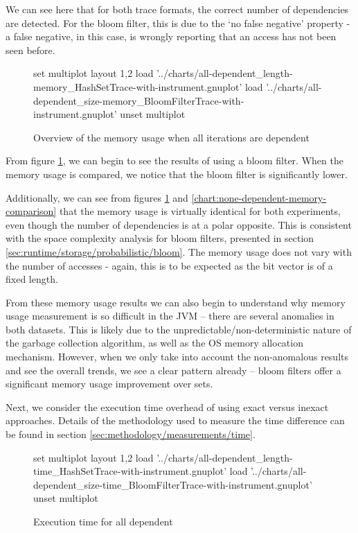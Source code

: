 	We can see here that for both trace formats, the correct number of dependencies are detected. For the bloom filter, this is due to the `no false negative' property - a false negative, in this case, is wrongly reporting that an access has not been seen before.
	
	\begin{figure}
		\centering
		\begin{gnuplot}[terminal=pdf]
		set multiplot layout 1,2
			load '../charts/all-dependent_length-memory_HashSetTrace-with-instrument.gnuplot'
			load '../charts/all-dependent_size-memory_BloomFilterTrace-with-instrument.gnuplot'
					unset multiplot
		\end{gnuplot}
		\caption{Overview of the memory usage when all iterations are dependent}
		\label{chart:all-dependent-memory-comparison}
	\end{figure}
	
	From figure \ref{chart:all-dependent-memory-comparison}, we can begin to see the results of using a bloom filter. When the memory usage is compared, we notice that the bloom filter is significantly lower.
	
	Additionally, we can see from figures \ref{chart:all-dependent-memory-comparison} and \ref{chart:none-dependent-memory-comparison} that the memory usage is virtually identical for both experiments, even though the number of dependencies is at a polar opposite. This is consistent with the space complexity analysis for bloom filters, presented in section \ref{sec:runtime/storage/probabilistic/bloom}. The memory usage does not vary with the number of accesses - again, this is to be expected as the bit vector is of a fixed length.
	
	From these memory usage results we can also begin to understand why memory usage measurement is so difficult in the JVM -- there are several anomalies in both datasets. This is likely due to the unpredictable/non-deterministic nature of the garbage collection algorithm, as well as the OS memory allocation mechanism. However, when we only take into account the non-anomalous results and see the overall trends, we see a clear pattern already -- bloom filters offer a significant memory usage improvement over sets.
	
	Next, we consider the execution time overhead of using exact versus inexact approaches. Details of the methodology used to measure the time difference can be found in section \ref{sec:methodology/measurements/time}.
	
	\begin{figure}
		\centering
		\begin{gnuplot}[terminal=pdf]
		set multiplot layout 1,2
			load '../charts/all-dependent_length-time_HashSetTrace-with-instrument.gnuplot'
			load '../charts/all-dependent_size-time_BloomFilterTrace-with-instrument.gnuplot'
		unset multiplot
		\end{gnuplot}
		\caption{Execution time for all dependent}
		\label{chart:all-dependent-time-comparison}
	\end{figure}
	
